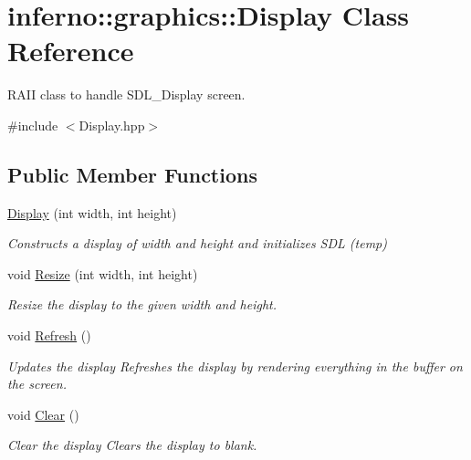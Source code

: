 \hypertarget{classinferno_1_1graphics_1_1_display}{}\section{inferno\+:\+:graphics\+:\+:Display Class Reference}
\label{classinferno_1_1graphics_1_1_display}


R\+A\+II class to handle S\+D\+L\+\_\+\+Display screen.  




{\ttfamily \#include $<$Display.\+hpp$>$}

\subsection*{Public Member Functions}
\begin{DoxyCompactItemize}
\item 
\mbox{\hyperlink{classinferno_1_1graphics_1_1_display_a8209b018b72b97990c10e67054ef813e}{Display}} (int width, int height)
\begin{DoxyCompactList}\small\item\em Constructs a display of width and height and initializes S\+DL (temp) \end{DoxyCompactList}\item 
void \mbox{\hyperlink{classinferno_1_1graphics_1_1_display_abb7ee350b8273145d1b9a4e5c3c73b58}{Resize}} (int width, int height)
\begin{DoxyCompactList}\small\item\em Resize the display to the given width and height. \end{DoxyCompactList}\item 
void \mbox{\hyperlink{classinferno_1_1graphics_1_1_display_abb61ee638514984ecf3fb94e1fcdddec}{Refresh}} ()
\begin{DoxyCompactList}\small\item\em Updates the display Refreshes the display by rendering everything in the buffer on the screen. \end{DoxyCompactList}\item 
void \mbox{\hyperlink{classinferno_1_1graphics_1_1_display_aabd8a093188d59ac2399abd66e5f00d8}{Clear}} ()
\begin{DoxyCompactList}\small\item\em Clear the display Clears the display to blank. \end{DoxyCompactList}\item 

\end{DoxyCompactItemize}
